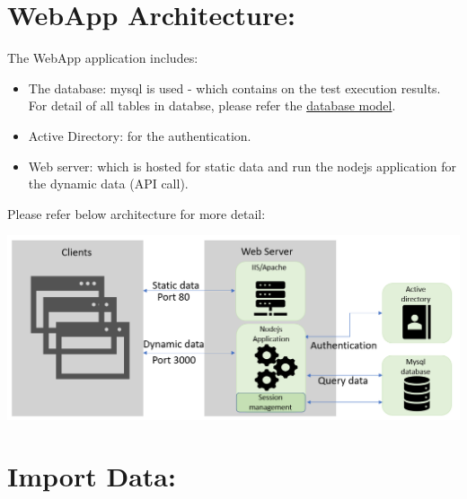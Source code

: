 



\hypertarget{webapp-architecture}{%
\section{WebApp Architecture:}\label{webapp-architecture}}

The WebApp application includes:
\begin{itemize}
   \item The database: mysql is used - which contains on the test execution 
         results. For detail of all tables in databse, please refer the 
         \href{https://github.com/test-fullautomation/testresultwebapp/blob/
         develop/TestResultWebApp/mysql_server/datamodel/datamodel.svg}{database
         model}.
   \item Active Directory: for the authentication.
   \item Web server: which is hosted for static data and run the nodejs 
         application for the dynamic data (API call).
\end{itemize}

Please refer below architecture for more detail:

\includegraphics[width=1\linewidth]{./pictures/Architechture.png}

\hypertarget{import-data}{%
\section{Import Data:}\label{import-data}}

